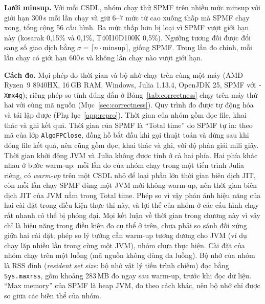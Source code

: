 \textbf{Lưới minsup.} Với mỗi CSDL, nhóm chạy thử SPMF trên nhiều mức minsup với giới hạn 300\,s mỗi lần chạy và giữ
6–7 mức từ cao xuống thấp mà SPMF chạy xong, tổng cộng 56 cấu hình. Ba mức thấp hơn bị loại vì SPMF vượt giới hạn
này (kosarak 0{,}15\% và 0{,}1\%, T40I10D100K 0{,}5\%). Ngưỡng tương đối được đổi sang số giao dịch bằng
$\sigma = \lceil n \cdot \text{minsup} \rceil$, giống SPMF. Trong lần đo chính, mỗi lần chạy có giới hạn 600\,s và
không lần chạy nào vượt giới hạn.

\begin{table}[!htb]
\caption{Chín CSDL benchmark sau khi chuẩn hóa}
\label{tab:datasets}
\centering
{}
\end{table}

\textbf{Cách đo.} Mọi phép đo thời gian và bộ nhớ chạy trên cùng một máy (AMD Ryzen~9 8940HX, 16\,GB RAM, Windows,
Julia 1.13.4, OpenJDK 25, SPMF với \texttt{-Xmx4g}); riêng phép so tính đúng đắn ở Bảng~\ref{tab:correctness} chạy trên
máy thứ hai với cùng mã nguồn (Mục~\ref{sec:correctness}). Quy trình đo được tự động hóa và tái lập được
(Phụ lục~\ref{app:repro}). Thời gian của
nhóm gồm đọc file, khai thác và ghi kết quả. Thời gian của SPMF là ``Total time'' do SPMF tự in: theo mã của lớp
\texttt{AlgoFPClose}, đồng hồ bắt đầu khi gọi thuật toán và dừng sau khi đóng file kết quả, nên cũng gồm đọc, khai
thác và ghi, với độ phân giải mili giây. Thời gian khởi động JVM và Julia không được tính ở cả hai phía. Hai phía
khác nhau ở bước warm-up: mỗi lần đo của nhóm chạy trong một tiến trình Julia riêng, có \textit{warm-up} trên một
CSDL nhỏ để loại phần lớn thời gian biên dịch JIT, còn mỗi lần chạy SPMF dùng một JVM mới không warm-up, nên thời
gian biên dịch JIT của JVM nằm trong Total time. Phép so vì vậy phản ánh hiệu năng của hai cài đặt trong điều kiện
thực thi này, và lợi thế của nhóm ở các cấu hình chạy rất nhanh có thể bị phóng đại. Mọi kết luận về thời gian trong
chương này vì vậy chỉ là hiệu năng trong điều kiện đo cụ thể ở trên, chưa phải so sánh đối xứng giữa hai cài đặt;
phép so lý tưởng cần warm-up tương đương cho JVM (ví dụ chạy lặp nhiều lần trong cùng một JVM), nhóm chưa thực hiện. Cài đặt của nhóm chạy trên một
luồng (mã nguồn không dùng đa luồng). Bộ nhớ của nhóm là RSS đỉnh (\textit{resident set size}: bộ nhớ vật lý tiến
trình chiếm) đọc bằng \texttt{Sys.maxrss}, gồm khoảng 283\,MB đo ngay sau warm-up, trước khi đọc dữ liệu. ``Max memory'' của SPMF là heap JVM, đo theo cách khác, nên bộ nhớ chỉ được so giữa các biến thể của nhóm.

